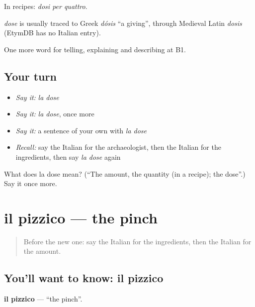 In recipes: \emph{dosi per quattro}.

\begin{cousinweb}
\emph{dose} is usually traced to Greek \emph{dósis} \textquotedblleft{}a giving\textquotedblright{}, through Medieval Latin \emph{dosis} (EtymDB has no Italian entry).
\end{cousinweb}

\begin{grammarlens}[title={What you've built}]
One more word for telling, explaining and describing at B1.
\end{grammarlens}

\subsection*{Your turn}
\begin{itemize}
\raggedright
  \item \emph{Say it:} \emph{la dose}
  \item \emph{Say it:} \emph{la dose}, once more
  \item \emph{Say it:} a sentence of your own with \emph{la dose}
  \item \emph{Recall:} say the Italian for the archaeologist, then the Italian for the ingredients, then say \emph{la dose} again
\end{itemize}

\begin{tcolorbox}[breakable,colback=teal!4,colframe=teal!35!black,title={Before you move on}]
What does la dose mean? (\textquotedblleft{}The amount, the quantity (in a recipe); the dose\textquotedblright{}.) Say it once more.
\end{tcolorbox}
\section[il pizzico]{il pizzico — the pinch}

\label{lesson:IT-C331-pizzico}



\begin{quote}
Before the new one: say the Italian for the ingredients, then the Italian for the amount.
\end{quote}

\subsection*{You'll want to know: il pizzico}
\textbf{il pizzico} — \textquotedblleft{}the pinch\textquotedblright{}.

